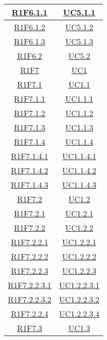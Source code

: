 \begin{longtable}{|c|c|}
\hline
\hyperlink{R1F6.1.1}{R1F6.1.1} & \hyperlink{UC5.1.1}{UC5.1.1}\\
\hline
\hyperlink{R1F6.1.2}{R1F6.1.2} & \hyperlink{UC5.1.2}{UC5.1.2}\\
\hline
\hyperlink{R1F6.1.3}{R1F6.1.3} & \hyperlink{UC5.1.3}{UC5.1.3}\\
\hline
\hyperlink{R1F6.2}{R1F6.2} & \hyperlink{UC5.2}{UC5.2}\\
\hline
\hyperlink{R1F7}{R1F7} & \hyperlink{UC1}{UC1}\\
\hline
\hyperlink{R1F7.1}{R1F7.1} & \hyperlink{UC1.1}{UC1.1}\\
\hline
\hyperlink{R1F7.1.1}{R1F7.1.1} & \hyperlink{UC1.1.1}{UC1.1.1}\\
\hline
\hyperlink{R1F7.1.2}{R1F7.1.2} & \hyperlink{UC1.1.2}{UC1.1.2}\\
\hline
\hyperlink{R1F7.1.3}{R1F7.1.3} & \hyperlink{UC1.1.3}{UC1.1.3}\\
\hline
\hyperlink{R1F7.1.4}{R1F7.1.4} & \hyperlink{UC1.1.4}{UC1.1.4}\\
\hline
\hyperlink{R1F7.1.4.1}{R1F7.1.4.1} & \hyperlink{UC1.1.4.1}{UC1.1.4.1}\\
\hline
\hyperlink{R1F7.1.4.2}{R1F7.1.4.2} & \hyperlink{UC1.1.4.2}{UC1.1.4.2}\\
\hline
\hyperlink{R1F7.1.4.3}{R1F7.1.4.3} & \hyperlink{UC1.1.4.3}{UC1.1.4.3}\\
\hline
\hyperlink{R1F7.2}{R1F7.2} & \hyperlink{UC1.2}{UC1.2}\\
\hline
\hyperlink{R1F7.2.1}{R1F7.2.1} & \hyperlink{UC1.2.1}{UC1.2.1}\\
\hline
\hyperlink{R1F7.2.2}{R1F7.2.2} & \hyperlink{UC1.2.2}{UC1.2.2}\\
\hline
\hyperlink{R1F7.2.2.1}{R1F7.2.2.1} & \hyperlink{UC1.2.2.1}{UC1.2.2.1}\\
\hline
\hyperlink{R1F7.2.2.2}{R1F7.2.2.2} & \hyperlink{UC1.2.2.2}{UC1.2.2.2}\\
\hline
\hyperlink{R1F7.2.2.3}{R1F7.2.2.3} & \hyperlink{UC1.2.2.3}{UC1.2.2.3}\\
\hline
\hyperlink{R1F7.2.2.3.1}{R1F7.2.2.3.1} & \hyperlink{UC1.2.2.3.1}{UC1.2.2.3.1}\\
\hline
\hyperlink{R1F7.2.2.3.2}{R1F7.2.2.3.2} & \hyperlink{UC1.2.2.3.2}{UC1.2.2.3.2}\\
\hline
\hyperlink{R1F7.2.2.4}{R1F7.2.2.4} & \hyperlink{UC1.2.2.4}{UC1.2.2.3.4}\\
\hline
\hyperlink{R1F7.3}{R1F7.3} & \hyperlink{UC1.3}{UC1.3}\\
\hline

\end{longtable}
